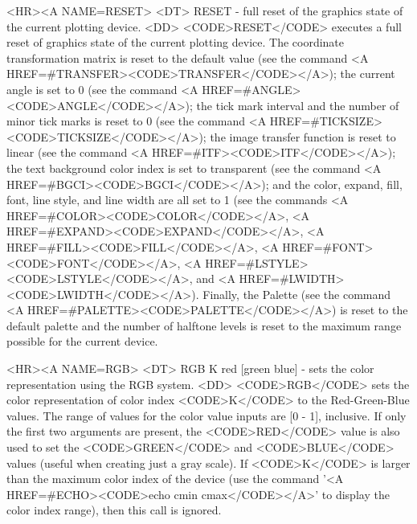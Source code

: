 \begin{rawhtml}
<HR><A NAME=RESET>
<DT>
RESET - full reset of the graphics state of the current plotting device.
<DD>
	<CODE>RESET</CODE> executes a full reset of graphics state of the
	current plotting device.  The coordinate transformation matrix is
	reset to the default value (see the command
	<A HREF=#TRANSFER><CODE>TRANSFER</CODE></A>); the current
	angle is set to 0 (see the command
	<A HREF=#ANGLE><CODE>ANGLE</CODE></A>); the
	tick mark interval and the number of minor tick marks is reset to 0
	(see the command <A HREF=#TICKSIZE><CODE>TICKSIZE</CODE></A>); the
	image transfer function is reset to linear (see the command
	<A HREF=#ITF><CODE>ITF</CODE></A>); the text background color index
	is set to transparent (see the command
	<A HREF=#BGCI><CODE>BGCI</CODE></A>); and the
	color, expand, fill, font, line style, and line width are all set
	to 1 (see the commands <A HREF=#COLOR><CODE>COLOR</CODE></A>,
	<A HREF=#EXPAND><CODE>EXPAND</CODE></A>,
	<A HREF=#FILL><CODE>FILL</CODE></A>,
	<A HREF=#FONT><CODE>FONT</CODE></A>,
	<A HREF=#LSTYLE><CODE>LSTYLE</CODE></A>, and
	<A HREF=#LWIDTH><CODE>LWIDTH</CODE></A>).  Finally, the Palette
	(see the command <A HREF=#PALETTE><CODE>PALETTE</CODE></A>) is
	reset to the default palette and the number of halftone levels is
	reset to the maximum range possible for the current device.

<HR><A NAME=RGB>
<DT>
RGB K red [green blue] - sets the color representation using the RGB system.
<DD>
	<CODE>RGB</CODE> sets the color representation of color index
	<CODE>K</CODE> to the Red-Green-Blue values.  The range of values
	for the color value inputs are [0 - 1], inclusive.  If only the
	first two arguments are present, the <CODE>RED</CODE> value is
	also used to set the <CODE>GREEN</CODE> and <CODE>BLUE</CODE> values
	(useful when creating just a gray scale).
	If <CODE>K</CODE> is larger than the maximum color index of the
	device (use the command '<A HREF=#ECHO><CODE>echo cmin cmax</CODE></A>'
	to display the color index range), then this call is ignored.


\end{rawhtml}
